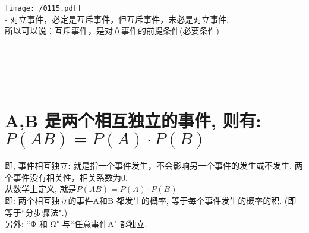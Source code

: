 \documentclass[UTF8]{ctexart}
\begin{document}
	\texttt{[image: /0115.pdf]} \\
	
	
	
	- 对立事件，必定是互斥事件，但互斥事件，未必是对立事件. \\
	所以可以说：互斥事件，是对立事件的前提条件(必要条件)
	
	
	
	~\\
	\hrule
	~\\
	
	\section{A,B 是两个相互独立的事件, 则有: $P(AB)= P(A) \cdot P(B)$}
	
	即, 事件相互独立: 就是指一个事件发生，不会影响另一个事件的发生或不发生. 两个事件没有相关性，相关系数为0. \\
	从数学上定义, 就是$ P(AB)=P(A) \cdot P(B)$ \\
	即: 两个相互独立的事件A和B 都发生的概率, 等于每个事件发生的概率的积. (即等于``分步骤法".) \\
	
	另外:  ``Φ 和 Ω" 与``任意事件A" 都独立. \\
	
\end{document}
